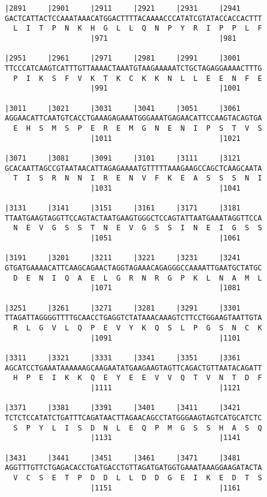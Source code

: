 \documentclass{article}
\begin{document}
\begin{Verbatim}
|2891     |2901     |2911     |2921     |2931     |2941     
GACTCATTACTCCAAATAAACATGGACTTTTACAAAACCCATATCGTATACCACCACTTT
  L  I  T  P  N  K  H  G  L  L  Q  N  P  Y  R  I  P  P  L  F
                    |971                          |981      
  
|2951     |2961     |2971     |2981     |2991     |3001     
TTCCCATCAAGTCATTTGTTAAAACTAAATGTAAGAAAAATCTGCTAGAGGAAAACTTTG
  P  I  K  S  F  V  K  T  K  C  K  K  N  L  L  E  E  N  F  E
                    |991                          |1001     
  
|3011     |3021     |3031     |3041     |3051     |3061     
AGGAACATTCAATGTCACCTGAAAGAGAAATGGGAAATGAGAACATTCCAAGTACAGTGA
  E  H  S  M  S  P  E  R  E  M  G  N  E  N  I  P  S  T  V  S
                    |1011                         |1021     
  
|3071     |3081     |3091     |3101     |3111     |3121     
GCACAATTAGCCGTAATAACATTAGAGAAAATGTTTTTAAAGAAGCCAGCTCAAGCAATA
  T  I  S  R  N  N  I  R  E  N  V  F  K  E  A  S  S  S  N  I
                    |1031                         |1041     
  
|3131     |3141     |3151     |3161     |3171     |3181     
TTAATGAAGTAGGTTCCAGTACTAATGAAGTGGGCTCCAGTATTAATGAAATAGGTTCCA
  N  E  V  G  S  S  T  N  E  V  G  S  S  I  N  E  I  G  S  S
                    |1051                         |1061     
  
|3191     |3201     |3211     |3221     |3231     |3241     
GTGATGAAAACATTCAAGCAGAACTAGGTAGAAACAGAGGGCCAAAATTGAATGCTATGC
  D  E  N  I  Q  A  E  L  G  R  N  R  G  P  K  L  N  A  M  L
                    |1071                         |1081     
  
|3251     |3261     |3271     |3281     |3291     |3301     
TTAGATTAGGGGTTTTGCAACCTGAGGTCTATAAACAAAGTCTTCCTGGAAGTAATTGTA
  R  L  G  V  L  Q  P  E  V  Y  K  Q  S  L  P  G  S  N  C  K
                    |1091                         |1101     
  
|3311     |3321     |3331     |3341     |3351     |3361     
AGCATCCTGAAATAAAAAAGCAAGAATATGAAGAAGTAGTTCAGACTGTTAATACAGATT
  H  P  E  I  K  K  Q  E  Y  E  E  V  V  Q  T  V  N  T  D  F
                    |1111                         |1121     
  
|3371     |3381     |3391     |3401     |3411     |3421     
TCTCTCCATATCTGATTTCAGATAACTTAGAACAGCCTATGGGAAGTAGTCATGCATCTC
  S  P  Y  L  I  S  D  N  L  E  Q  P  M  G  S  S  H  A  S  Q
                    |1131                         |1141     
  
|3431     |3441     |3451     |3461     |3471     |3481     
AGGTTTGTTCTGAGACACCTGATGACCTGTTAGATGATGGTGAAATAAAGGAAGATACTA
  V  C  S  E  T  P  D  D  L  L  D  D  G  E  I  K  E  D  T  S
                    |1151                         |1161     
  

\end{Verbatim}
\end{document}
